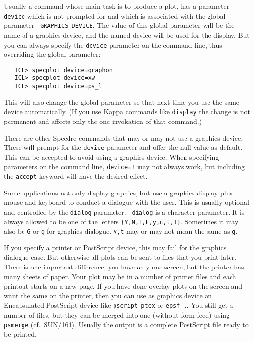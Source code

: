 Usually a command whose main task is to produce a plot,
has a parameter {\tt device} which is not
prompted for and which is associated with the global parameter {\tt
GRAPHICS\_DEVICE}. The value of this global parameter will be the name of a
graphics device, and the named device will be used for the display.
But you can always specify the {\tt device} parameter on the command line, thus
overriding the global parameter:

\begin{verbatim}
   ICL> specplot device=graphon
   ICL> specplot device=xw
   ICL> specplot device=ps_l
\end{verbatim}

This will also change the global parameter so that next time you use the same
device automatically.  (If you use Kappa commands like {\tt display} the
change is not permanent and affects only the one invokation of that command.)

There are other Specdre commands that may or may not use a graphics device.
These will prompt for the {\tt device} parameter and offer the null value as
default. This can be accepted to avoid using a graphics device. When specifying
parameters on the command line, {\tt device=!} may not always work, but
including the {\tt accept} keyword will have the desired effect.

Some applications not only display graphics, but use a graphics display
plus mouse and keyboard to conduct a dialogue with the user.  This is
usually optional and controlled by the {\tt dialog} parameter.  {\tt
dialog} is a character parameter.  It is always allowed to be one of the
letters {\tt\{Y,N,T,F,y,n,t,f\}}.  Sometimes it may also be {\tt G} or
{\tt g} for graphics dialogue.  {\tt y,t} may or may not mean the same
as {\tt g}.

If you specify a printer or PostScript device, this may fail for the
graphics dialogue case.  But otherwise all plots can be sent to files
that you print later.  There is one important difference, you have only
one screen, but the printer has many sheets of paper.  Your plot may be
in a number of printer files and each printout starts on a new page.  If
you have done overlay plots on the screen and want the same on the
printer, then you can use as graphics device an Encapsulated PostScript
device like {\tt pscript\_ptex} or {\tt epsf\_l}.  You still get a number
of files, but they can be merged into one (without form feed) using {\tt
psmerge} (cf.\ SUN/164).  Usually the output is a complete PostScript
file ready to be printed.

